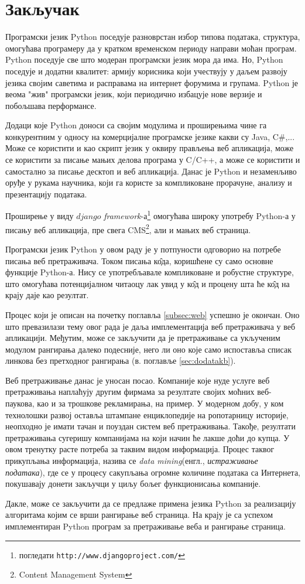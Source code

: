 \section{Закључак}

Програмски језик Python поседује разноврстан избор типова података, структура, омогућава програмеру да у кратком временском периоду направи моћан програм. Python поседује све што модеран програмски језик мора да има. Но, Python поседује  и додатни квалитет: армију корисника који учествују у даљем развоју језика својим саветима и расправама на интернет форумима и групама. Python је веома "жив" програмски језик, који периодично избацује нове верзије и побољшава перформансе. 

Додаци које Python доноси са својим модулима и проширењима чине га конкурентним у односу на комерцијалне програмске језике какви су Java, C\#,... Може се користити и као скрипт језик у оквиру прављења веб апликација, може се користити за писање мањих делова програма у C/C++, а може се користити и самостално за писање десктоп и веб апликација. Данас је Python и незаменљиво оруђе у рукама научника, који га користе за компликоване прорачуне, анализу и презентацију података. 

Проширење у виду $django$ \emph{framework}-а\footnote{погледати \texttt{http://www.djangoproject.com/}} омогућава широку употребу Python-а у писању веб апликација, пре свега CMS\footnote{Content Management System}, али и мањих веб страница. 

Програмски језик Python у овом раду је у потпуности одговорио на потребе писања веб претраживача. Током писања к\^{о}да, коришћене су само основне функције Python-а. Нису се употребљавале компликоване и робустне структуре, што омогућава потенцијалном читаоцу лак увид у к\^{о}д и процену шта ће к\^{о}д на крају даје као резултат.

Процес који је описан на почетку поглавља \ref{subsec:web} успешно је окончан. Оно што превазилази тему овог рада је даља имплементација веб претраживача у веб апликацији. Међутим, може се закључити да је претраживање са укљученим модулом рангирања далеко подесније, него ли оно које само испоставља списак линкова без претходног рангирања (в. поглавље \ref{sec:dodatakb}). 

Веб претраживање данас је уносан посао. Компаније које нуде услуге веб претраживања наплаћују другим фирмама за резултате својих моћних веб-паукова, као и за трошкове рекламирања, на пример. У модерном добу, у ком технолошки развој оставља штампане енциклопедије на ропотарницу историје, неопходно је имати тачан и поуздан систем веб претраживања. Такође, резултати претраживања сугеришу компанијама на који начин ће лакше доћи до купца. У овом тренутку расте потреба за таквим видом информација. Процес таквог прикупљања информација, назива се \emph{data mining}(енгл., \emph{истраживање података}), где се у процесу сакупљања огромне количине података са Интернета, покушавају донети закључци у циљу бољег функционисања компаније.

Дакле, може се закључити да се предлаже примена језика Python за реализацију алгоритама којим се врши рангирање веб страница. На крају је са успехом имплементиран Python програм за претраживање веба и рангирање страница.
